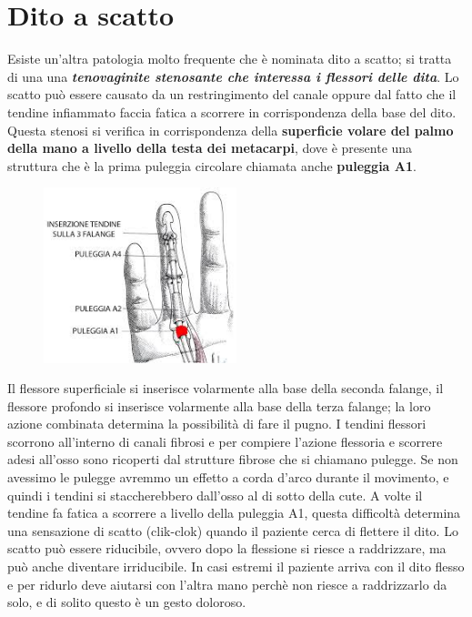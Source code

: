 \section{Dito a scatto}

Esiste un'altra patologia molto frequente che è nominata dito a scatto; si tratta di una una \textbf{\emph{tenovaginite stenosante che interessa
i flessori delle dita}}. Lo scatto può essere causato da un restringimento del canale oppure dal fatto che il tendine infiammato faccia fatica a scorrere in corrispondenza della base del dito. Questa stenosi si verifica in corrispondenza della \textbf{superficie volare del palmo della mano a livello della testa dei metacarpi}, dove è presente una struttura che è la prima puleggia circolare chiamata anche \textbf{puleggia A1}.

\begin{figure}[!ht]
\centering
\includegraphics[width=0.5\textwidth]{005/image6.png}
\end{figure}

Il flessore superficiale si inserisce volarmente alla base della seconda falange, il flessore profondo si inserisce volarmente alla base della
terza falange; la loro azione combinata determina la possibilità di fare il pugno. I tendini flessori scorrono all'interno di canali fibrosi e per compiere l'azione flessoria e scorrere adesi all'osso sono ricoperti dal strutture fibrose che si chiamano pulegge. Se non avessimo le pulegge avremmo un effetto a corda d'arco durante il movimento, e quindi i tendini si staccherebbero dall'osso al di sotto della cute. A volte il tendine fa fatica a scorrere a livello della puleggia A1, questa
difficoltà determina una sensazione di scatto (clik-clok) quando il paziente cerca di flettere il dito. Lo scatto può essere riducibile, ovvero dopo la flessione si riesce a raddrizzare, ma può anche diventare irriducibile. In casi estremi il paziente arriva con il dito flesso e per ridurlo deve aiutarsi con l'altra mano perchè non riesce a
raddrizzarlo da solo, e di solito questo è un gesto doloroso.

